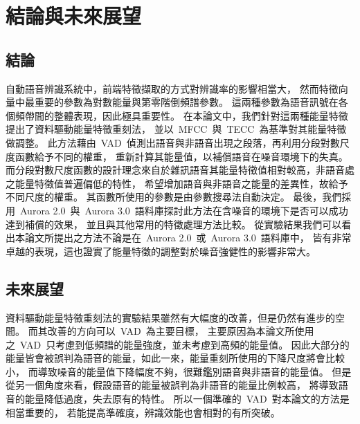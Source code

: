 \chapter{結論與未來展望}
\label{ch:conclusion}
\section{結論}
自動語音辨識系統中，前端特徵擷取的方式對辨識率的影響相當大，
然而特徵向量中最重要的參數為對數能量與第零階倒頻譜參數。
這兩種參數為語音訊號在各個頻帶間的整體表現，因此極具重要性。
在本論文中，我們針對這兩種能量特徵提出了資料驅動能量特徵重刻法，
並以~MFCC~與~TECC~為基準對其能量特徵做調整。
此方法藉由~VAD~偵測出語音與非語音出現之段落，再利用分段對數尺度函數給予不同的權重，
重新計算其能量值，以補償語音在噪音環境下的失真。
而分段對數尺度函數的設計理念來自於雜訊語音其能量特徵值相對較高，非語音處之能量特徵值普遍偏低的特性，
希望增加語音與非語音之能量的差異性，故給予不同尺度的權重。
其函數所使用的參數是由參數搜尋法自動決定。
最後，我們採用~Aurora 2.0~與~Aurora 3.0~語料庫探討此方法在含噪音的環境下是否可以成功達到補償的效果，
並且與其他常用的特徵處理方法比較。
從實驗結果我們可以看出本論文所提出之方法不論是在~Aurora 2.0~或~Aurora 3.0~語料庫中，
皆有非常卓越的表現，這也證實了能量特徵的調整對於噪音強健性的影響非常大。

\section{未來展望}
資料驅動能量特徵重刻法的實驗結果雖然有大幅度的改善，但是仍然有進步的空間。
而其改善的方向可以~VAD~為主要目標，
主要原因為本論文所使用之~VAD~只考慮到低頻譜的能量強度，並未考慮到高頻的能量值。
因此大部分的能量皆會被誤判為語音的能量，如此一來，能量重刻所使用的下降尺度將會比較小，
而導致噪音的能量值下降幅度不夠，很難鑑別語音與非語音的能量值。
但是從另一個角度來看，假設語音的能量被誤判為非語音的能量比例較高，
將導致語音的能量降低過度，失去原有的特性。
所以一個準確的~VAD~對本論文的方法是相當重要的，
若能提高準確度，辨識效能也會相對的有所突破。